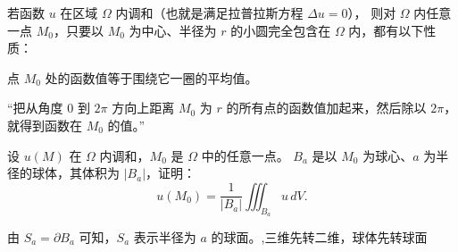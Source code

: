 \begin{dxtips}
    若函数 $u$ 在区域 $\Omega$ 内调和（也就是满足拉普拉斯方程 $\Delta u = 0$），
则对 $\Omega$ 内任意一点 $M_0$，只要以 $M_0$ 为中心、半径为 $r$ 的小圆完全包含在 $\Omega$ 内，都有以下性质：

点 $M_0$ 处的函数值等于围绕它一圈的平均值。



“把从角度 $0$ 到 $2\pi$ 方向上距离 $M_0$ 为 $r$ 的所有点的函数值加起来，然后除以 $2\pi$，就得到函数在 $M_0$ 的值。”
\end{dxtips}
\begin{homework}[3]
设 $u(M)$ 在 $\Omega$ 内调和，$M_0$ 是 $\Omega$ 中的任意一点。
$B_a$ 是以 $M_0$ 为球心、$a$ 为半径的球体，其体积为 $|B_a|$，证明：
\[
u(M_0)=\frac{1}{|B_a|}\iiint_{B_a} u\,dV.
\]
\end{homework}
\begin{dxtips}
    由 $S_a = \partial B_a$ 可知，$S_a$ 表示半径为 $a$ 的球面。,三维先转二维，球体先转球面
\end{dxtips}
